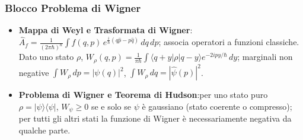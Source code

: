 \documentclass[12pt, a4paper]{article}
\begin{document}
	\subsubsection{Blocco Problema di Wigner}
	\begin{itemize}
		\item \textbf{Mappa di Weyl e Trasformata di Wigner}: $\hat{A}_f = \frac{1}{(2\pi\hbar)^n}\int f(q,p)\, e^{\frac{i}{\hbar}(q\hat{p}-p\hat{q})}\,dq\,dp$; associa operatori a funzioni classiche. Dato uno stato $\rho$, $W_\rho(q,p) = \frac{1}{\pi\hbar}\int\langle q+y|\rho|q-y\rangle e^{-2ipy/\hbar}\,dy$; marginali non negative $\int W_\rho\,dp = |\psi(q)|^2$, $\int W_\rho\,dq = |\hat\psi(p)|^2$.
		\item \textbf{Problema di Wigner e Teorema di Hudson}:per uno stato puro $\rho=|\psi\rangle\langle\psi|$, $W_\psi \geq 0$ se e solo se $\psi$ è gaussiano (stato coerente o compresso); per tutti gli altri stati la funzione di Wigner è necessariamente negativa da qualche parte.
	\end{itemize}
	
\end{document}
